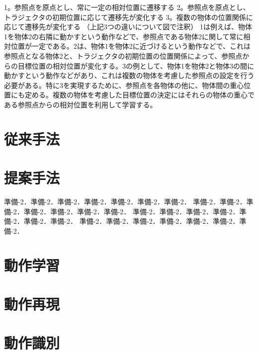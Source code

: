 1。参照点を原点とし、常に一定の相対位置に遷移する
2。参照点を原点とし、トラジェクタの初期位置に応じて遷移先が変化する
3。複数の物体の位置関係に応じて遷移先が変化する
（上記3つの違いについて図で注釈）
1は例えば、物体1を物体2の右隣に動かすという動作などで、参照点である物体2に関して常に相対位置が一定である。2は、物体1を物体2に近づけるという動作などで、これは参照点となる物体2と、トラジェクタの初期位置の位置関係によって、参照点からの目標位置の相対位置が変化する。3の例として、物体1を物体2と物体3の間に動かすという動作などがあり、これは複数の物体を考慮した参照点の設定を行う必要がある。特に3を実現するために、参照点を各物体の他に、物体間の重心位置にも定める。複数の物体を考慮した目標位置の決定にはそれらの物体の重心である参照点からの相対位置を利用して学習する。

\section{従来手法}

\section{提案手法}

準備-2．準備-2．準備-2．準備-2．準備-2．準備-2．準備-2．
準備-2．準備-2．準備-2．準備-2．準備-2．準備-2．準備-2．
準備-2．準備-2．準備-2．準備-2．準備-2．準備-2．準備-2．
準備-2．準備-2．準備-2．準備-2．準備-2．準備-2．準備-2．

\section{動作学習}

\section{動作再現}

\section{動作識別}
